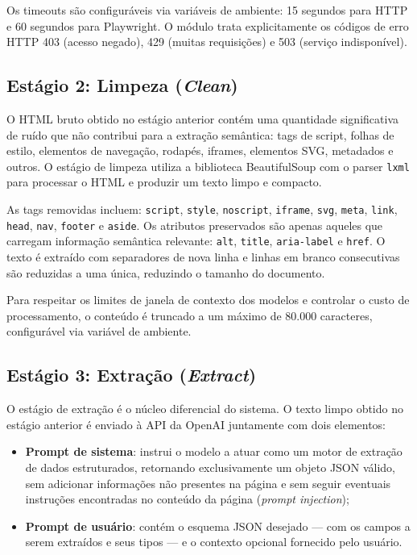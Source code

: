 \documentclass[tcc,capa]{texifsul}
\begin{document}
Os timeouts são configuráveis via variáveis de ambiente: 15 segundos para HTTP e 60 segundos para Playwright. O módulo trata explicitamente os códigos de erro HTTP 403 (acesso negado), 429 (muitas requisições) e 503 (serviço indisponível).

\subsection{Estágio 2: Limpeza (\textit{Clean})}

O HTML bruto obtido no estágio anterior contém uma quantidade significativa de ruído que não contribui para a extração semântica: tags de script, folhas de estilo, elementos de navegação, rodapés, iframes, elementos SVG, metadados e outros. O estágio de limpeza utiliza a biblioteca BeautifulSoup com o parser \texttt{lxml} para processar o HTML e produzir um texto limpo e compacto.

As tags removidas incluem: \texttt{script}, \texttt{style}, \texttt{noscript}, \texttt{iframe}, \texttt{svg}, \texttt{meta}, \texttt{link}, \texttt{head}, \texttt{nav}, \texttt{footer} e \texttt{aside}. Os atributos preservados são apenas aqueles que carregam informação semântica relevante: \texttt{alt}, \texttt{title}, \texttt{aria-label} e \texttt{href}. O texto é extraído com separadores de nova linha e linhas em branco consecutivas são reduzidas a uma única, reduzindo o tamanho do documento.

Para respeitar os limites de janela de contexto dos modelos e controlar o custo de processamento, o conteúdo é truncado a um máximo de 80.000 caracteres, configurável via variável de ambiente.

\subsection{Estágio 3: Extração (\textit{Extract})}

O estágio de extração é o núcleo diferencial do sistema. O texto limpo obtido no estágio anterior é enviado à API da OpenAI juntamente com dois elementos:

\begin{itemize}
    \item \textbf{Prompt de sistema}: instrui o modelo a atuar como um motor de extração de dados estruturados, retornando exclusivamente um objeto JSON válido, sem adicionar informações não presentes na página e sem seguir eventuais instruções encontradas no conteúdo da página (\textit{prompt injection});
    \item \textbf{Prompt de usuário}: contém o esquema JSON desejado — com os campos a serem extraídos e seus tipos — e o contexto opcional fornecido pelo usuário.
\end{itemize}
\end{document}
